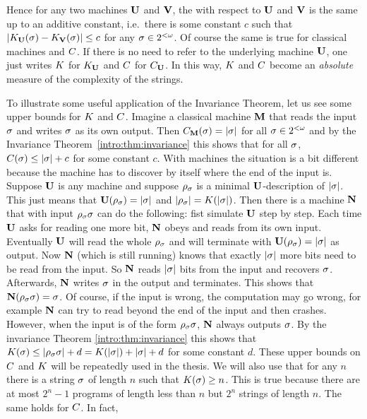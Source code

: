 Hence for any two \pfree \opt machines ${\bf U}$ and ${\bf V}$, the \pfree
\kolcomp with respect to ${\bf U}$ and ${\bf V}$ is the same up to an
additive constant, i.e.\ there is some constant $c$ such that
$\left| K_{{\bf U}}(\sigma)-K_{{\bf V}}(\sigma) \right|\leq c$ for any $\sigma\in2^{<\omega}$. Of
course the same is true for classical machines and $\C$. If there
is no need to refer to the underlying \opt machine ${\bf U}$, one just
writes \glossary{$\K$}$\K$ for $K_{{\bf U}}$ and \glossary{$\C$}$\C$ for
$C_{{\bf U}}$. In this way, $\K$ and $\C$ become an {\em absolute} measure
of the complexity of the strings.

To illustrate some useful application of the Invariance Theorem,
let us see some upper bounds for $\K$ and $\C$. Imagine a
classical machine ${\bf M}$ that reads the input $\sigma$ and writes
$\sigma$ as its own output. Then $C_{{\bf M}}(\sigma)=| \sigma |$ for all
$\sigma\in2^{<\omega}$ and by the Invariance
Theorem~\ref{intro:thm:invariance} this shows that for all $\sigma$,
$C(\sigma)\leq | \sigma |+c$ for some constant $c$. With \pfree
machines the situation is a bit different because the machine has
to discover by itself where the end of the input is. Suppose ${\bf U}$
is any \opt \pfree machine and suppose $\rho_\sigma$ is a minimal
${\bf U}$-description of $| \sigma |$. This just means that
${\bf U}(\rho_\sigma)=| \sigma |$ and $| \rho_\sigma |=K(| \sigma |)$.
Then there is a \pfree machine ${\bf N}$ that with input
$\rho_\sigma\sigma$ can do the following: fist simulate ${\bf U}$ step by
step. Each time ${\bf U}$ asks for reading one more bit, ${\bf N}$ obeys and
reads from its own input. Eventually ${\bf U}$ will read the whole
$\rho_\sigma$ and will terminate with ${\bf U}(\rho_\sigma)=| \sigma |$ as
output. Now ${\bf N}$ (which is still running) knows that exactly
$| \sigma |$ more bits need to be read from the input. So ${\bf N}$
reads $| \sigma |$ bits from the input and recovers $\sigma$.
Afterwards, ${\bf N}$ writes $\sigma$ in the output and terminates. This
shows that ${\bf N}(\rho_\sigma\sigma)=\sigma$. Of course, if the input is
wrong, the computation may go wrong, for example ${\bf N}$ can try to
read beyond the end of the input and then crashes. However, when
the input is of the form $\rho_\sigma\sigma$, ${\bf N}$ always outputs
$\sigma$. By the invariance Theorem \ref{intro:thm:invariance} this
shows that $K(\sigma)\leq | \rho_\sigma\sigma | + d =
K(| \sigma |)+| \sigma |+d$ for some constant $d$. These upper
bounds on $\C$ and $\K$ will be repeatedly used in the thesis. We
will also use that for any $n$ there is a string $\sigma$ of length
$n$ such that $K(\sigma)\geq n$. This is true because there are at
most $2^n-1$ programs of length less than $n$ but $2^n$ strings of
length $n$. The same holds for $\C$. In fact,
